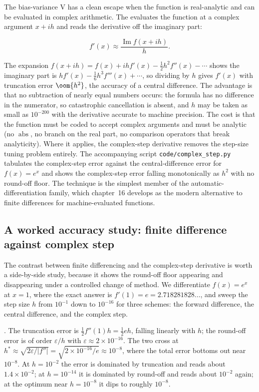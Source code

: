 \begin{mastery}
The bias-variance V has a clean escape when the function is
real-analytic and can be evaluated in complex arithmetic. The
 evaluates the function at a
complex argument $x + i h$ and reads the derivative off the
imaginary part:

\[
f'(x) \approx \frac{\operatorname{Im} f(x + i h)}{h}.
\]

The expansion $f(x + i h) = f(x) + i h f'(x) - \tfrac{1}{2} h^{2}
f''(x) - \cdots$ shows the imaginary part is $h f'(x) - \tfrac{1}{6}
h^{3} f'''(x) + \cdots$, so dividing by $h$ gives $f'(x)$ with
truncation error $\oom{h^{2}}$, the accuracy of a central
difference. The advantage is that no subtraction of nearly equal
numbers occurs: the formula has no difference in the numerator, so
catastrophic cancellation is absent, and $h$ may be taken as small
as $10^{-200}$ with the derivative accurate to machine precision.
The cost is that the function must be coded to accept complex
arguments and must be analytic (no $\operatorname{abs}$, no
branch on the real part, no comparison operators that break
analyticity). Where it applies, the complex-step derivative removes
the step-size tuning problem entirely. The accompanying script
\texttt{code/complex\_step.py} tabulates the complex-step error
against the central-difference error for $f(x) = e^{x}$ and shows
the complex-step error falling monotonically as $h^{2}$ with no
round-off floor. The technique is the simplest member of the
automatic-differentiation family, which chapter~16 develops as the
modern alternative to finite differences for machine-evaluated
functions.
\end{mastery}

\subsection{A worked accuracy study: finite difference against
complex step}

The contrast between finite differencing and the complex-step
derivative is worth a side-by-side study, because it shows the
round-off floor appearing and disappearing under a controlled
change of method. We differentiate $f(x) = e^{x}$ at $x = 1$, where
the exact answer is $f'(1) = e = 2.718281828\ldots$, and sweep the
step size $h$ from $10^{-1}$ down to $10^{-16}$ for three schemes:
the forward difference, the central difference, and the complex
step.

. The truncation error is
$\tfrac{1}{2} f''(1) h = \tfrac{1}{2} e h$, falling linearly with
$h$; the round-off error is of order $\varepsilon/h$ with
$\varepsilon \approx 2 \times 10^{-16}$. The two cross at $h^{*}
\approx \sqrt{2\varepsilon/|f''|} = \sqrt{2 \times 10^{-16}/e}
\approx 10^{-8}$, where the total error bottoms out near $10^{-8}$.
At $h = 10^{-2}$ the error is dominated by truncation and reads
about $1.4 \times 10^{-2}$; at $h = 10^{-14}$ it is dominated by
round-off and reads about $10^{-2}$ again; at the optimum near
$h = 10^{-8}$ it dips to roughly $10^{-8}$.

